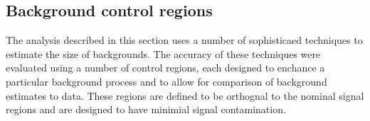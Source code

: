 


\subsection{Background control regions}

The analysis described in this section uses a number of sophisticaed techniques to estimate the size of backgrounds.
The accuracy of these techniques were evaluated using a number of control regions, each designed to enchance a particular background process and to allow for comparison of background estimates to data.
These regions are defined to be orthognal to the nominal signal regions and are designed to have minimial signal contamination.


